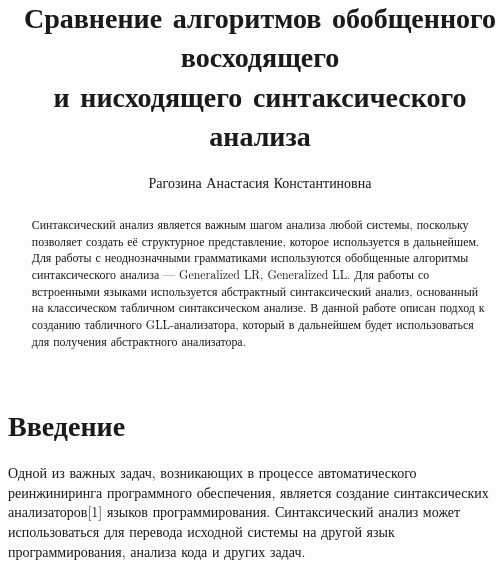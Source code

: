 \title{Сравнение алгоритмов обобщенного восходящего\\
и нисходящего синтаксического анализа}
%

\author{Рагозина Анастасия Константиновна}
%
%
%

\begin{abstract}
Синтаксический анализ является важным шагом анализа любой системы, поскольку позволяет создать её структурное представление, которое используется в дальнейшем. Для работы с неоднозначными грамматиками используются обобщенные алгоритмы синтаксического анализа --- Generalized LR, Generalized LL. Для работы со встроенными языками используется абстрактный синтаксический анализ, основанный на классическом табличном синтаксическом анализе. В данной работе описан подход к созданию табличного GLL-анализатора, который в дальнейшем будет использоваться для получения абстрактного анализатора.
\end{abstract}

\maketitle

\section*{Введение}
Одной из важных задач, возникающих в процессе автоматического реинжиниринга программного обеспечения, является создание синтаксических анализаторов[1] языков программирования. Синтаксический анализ может использоваться для перевода исходной системы на другой язык программирования, анализа кода и других задач.

